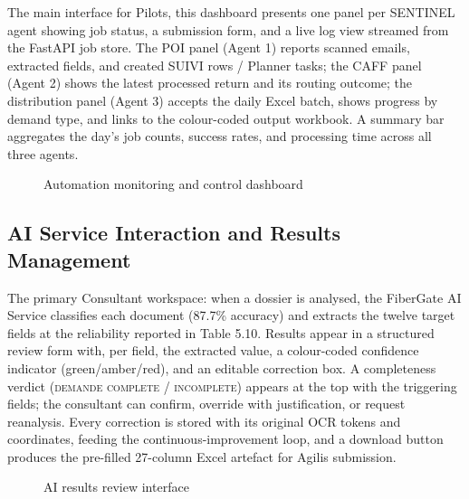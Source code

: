 The main interface for Pilots, this dashboard presents one panel per SENTINEL agent showing job status, a submission form, and a live log view streamed from the FastAPI job store. The POI panel (Agent 1) reports scanned emails, extracted fields, and created SUIVI rows / Planner tasks; the CAFF panel (Agent 2) shows the latest processed return and its routing outcome; the distribution panel (Agent 3) accepts the daily Excel batch, shows progress by demand type, and links to the colour-coded output workbook. A summary bar aggregates the day's job counts, success rates, and processing time across all three agents.

\begin{figure}[H]
  \centering
  \caption{Automation monitoring and control dashboard}
  \label{fig:automation-dashboard-screenshot}
\end{figure}

\subsection{AI Service Interaction and Results Management}

The primary Consultant workspace: when a dossier is analysed, the FiberGate AI Service classifies each document (87.7\% accuracy) and extracts the twelve target fields at the reliability reported in Table 5.10. Results appear in a structured review form with, per field, the extracted value, a colour-coded confidence indicator (green/amber/red), and an editable correction box. A completeness verdict (\textsc{demande complete} / \textsc{incomplete}) appears at the top with the triggering fields; the consultant can confirm, override with justification, or request reanalysis. Every correction is stored with its original OCR tokens and coordinates, feeding the continuous-improvement loop, and a download button produces the pre-filled 27-column Excel artefact for Agilis submission.

\begin{figure}[H]
  \centering
  \caption{AI results review interface}
  \label{fig:ai-review-screenshot}
\end{figure}

